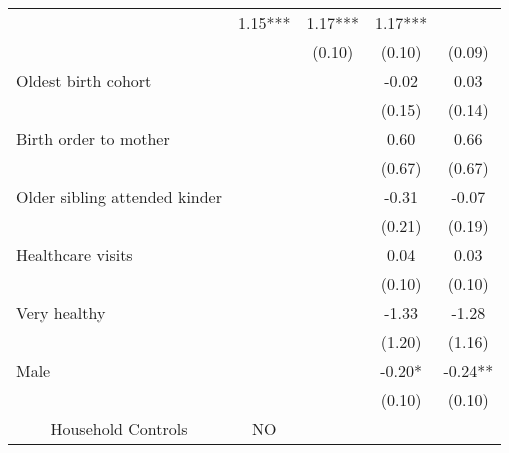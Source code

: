 \begin{tabular}{lllll}
  \multicolumn{1}{c}{} &
  \multicolumn{1}{c}{1.15***} &
  \multicolumn{1}{c}{1.17***} &
  \multicolumn{1}{c}{1.17***} \\
\multicolumn{1}{l}{} &
  \multicolumn{1}{c}{} &
  \multicolumn{1}{c}{(0.10)} &
  \multicolumn{1}{c}{(0.10)} &
  \multicolumn{1}{c}{(0.09)} \\
\multicolumn{1}{l}{Oldest birth cohort} &
  \multicolumn{1}{c}{} &
  \multicolumn{1}{c}{} &
  \multicolumn{1}{c}{-0.02 } &
  \multicolumn{1}{c}{0.03 } \\
\multicolumn{1}{l}{} &
  \multicolumn{1}{c}{} &
  \multicolumn{1}{c}{} &
  \multicolumn{1}{c}{(0.15)} &
  \multicolumn{1}{c}{(0.14)} \\
\multicolumn{1}{l}{Birth order to mother} &
  \multicolumn{1}{c}{} &
  \multicolumn{1}{c}{} &
  \multicolumn{1}{c}{0.60 } &
  \multicolumn{1}{c}{0.66 } \\
\multicolumn{1}{l}{} &
  \multicolumn{1}{c}{} &
  \multicolumn{1}{c}{} &
  \multicolumn{1}{c}{(0.67)} &
  \multicolumn{1}{c}{(0.67)} \\
\multicolumn{1}{l}{Older sibling attended kinder} &
  \multicolumn{1}{c}{} &
  \multicolumn{1}{c}{} &
  \multicolumn{1}{c}{-0.31 } &
  \multicolumn{1}{c}{-0.07 } \\
\multicolumn{1}{l}{} &
  \multicolumn{1}{c}{} &
  \multicolumn{1}{c}{} &
  \multicolumn{1}{c}{(0.21)} &
  \multicolumn{1}{c}{(0.19)} \\
\multicolumn{1}{l}{Healthcare visits} &
  \multicolumn{1}{c}{} &
  \multicolumn{1}{c}{} &
  \multicolumn{1}{c}{0.04 } &
  \multicolumn{1}{c}{0.03 } \\
\multicolumn{1}{l}{} &
  \multicolumn{1}{c}{} &
  \multicolumn{1}{c}{} &
  \multicolumn{1}{c}{(0.10)} &
  \multicolumn{1}{c}{(0.10)} \\
\multicolumn{1}{l}{Very healthy} &
  \multicolumn{1}{c}{} &
  \multicolumn{1}{c}{} &
  \multicolumn{1}{c}{-1.33 } &
  \multicolumn{1}{c}{-1.28 } \\
\multicolumn{1}{l}{} &
  \multicolumn{1}{c}{} &
  \multicolumn{1}{c}{} &
  \multicolumn{1}{c}{(1.20)} &
  \multicolumn{1}{c}{(1.16)} \\
\multicolumn{1}{l}{Male} &
  \multicolumn{1}{c}{} &
  \multicolumn{1}{c}{} &
  \multicolumn{1}{c}{-0.20* } &
  \multicolumn{1}{c}{-0.24** } \\
\multicolumn{1}{l}{} &
  \multicolumn{1}{c}{} &
  \multicolumn{1}{c}{} &
  \multicolumn{1}{c}{(0.10)} &
  \multicolumn{1}{c}{(0.10)} \\
\multicolumn{1}{c}{Household Controls} &
  \multicolumn{1}{c}{NO} &

\end{tabular}
